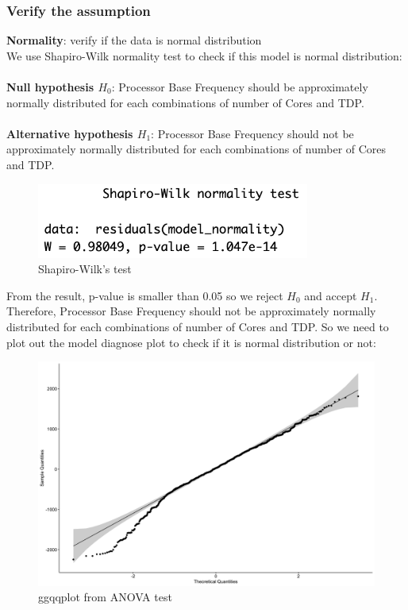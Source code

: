 \subsubsection{Verify the assumption}
\textbf{Normality}: verify if the data is normal distribution\\
We use Shapiro-Wilk normality test to check if this model is normal distribution:\\
\\
\textbf{Null hypothesis $H_0$}: Processor Base Frequency should be approximately normally distributed for each combinations of number of Cores and TDP.\\
\\
\textbf{Alternative hypothesis $H_1$}: Processor Base Frequency should not be approximately normally distributed for each combinations of number of Cores and TDP.
\begin{figure}[H]
    \centering
    \includegraphics[width=0.8\textwidth]{graphics/shapiro_test.png}
    \caption{Shapiro-Wilk's test}
\end{figure}
From the result, p-value is smaller than 0.05 so we reject $H_0$ and accept $H_1$. Therefore, Processor Base Frequency should not be approximately normally distributed for each combinations of number of Cores and TDP. So we need to plot out the model diagnose plot to check if it is normal distribution or not:
\begin{figure}[H]
    \centering
    \includegraphics[width=1\textwidth]{graphics/check_normality.png}
    \caption{ggqqplot from ANOVA test}
\end{figure}
